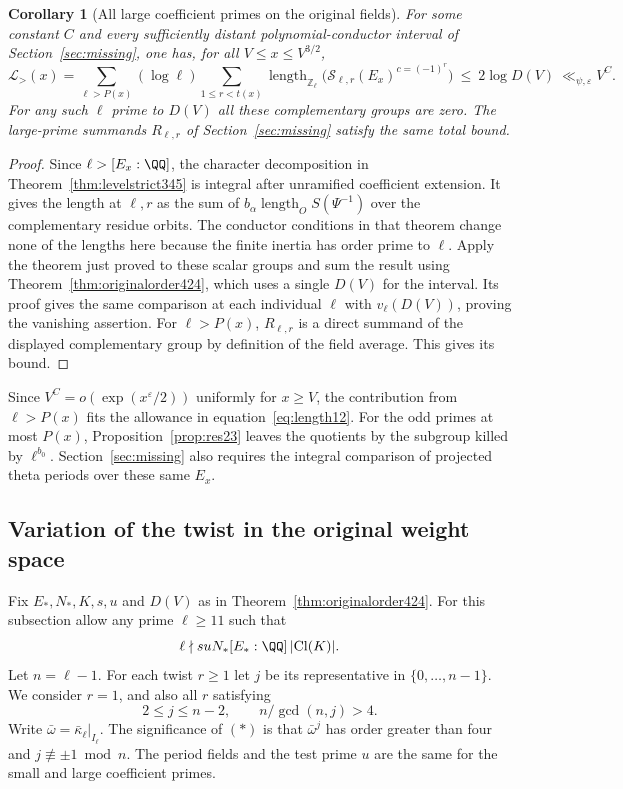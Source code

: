 \documentclass[a4paper,11pt]{article}
\newtheorem{corollary}[proposition]{Corollary}
\theoremstyle{definition}
\theoremstyle{remark}
\newcommand{\ZZ}{\mathbb Z}\newcommand{\ord}{\operatorname{ord}}
\numberwithin{equation}{section}
\begin{document}
\begin{corollary}[All large coefficient primes on the original fields]\leavevmode
\label{cor:periodlarge425}
For some constant \(C\) and every sufficiently distant
polynomial-conductor interval of Section~\ref{sec:missing},
one has, for all \(V\le x\le V^{3/2}\),
\[
 \mathcal L_{>}(x)=
 \sum_{\ell>P(x)}(\log\ell)\sum_{1\le r<t(x)}
      \operatorname{length}_{\ZZ_\ell}
      \bigl(\mathcal S_{\ell,r}(E_x)^{c=(-1)^r}\bigr)
   \ \le\ 2\log D(V)\ \ll_{\psi,\varepsilon} V^C .
\]
For any such \(\ell\) prime to \(D(V)\) all these complementary
groups are zero. The large-prime summands \(R_{\ell,r}\) of
Section~\ref{sec:missing} satisfy the same total bound.
\end{corollary}
\begin{proof}
Since \(\ell>[E_x:\QQ]\), the character decomposition in
Theorem~\ref{thm:levelstrict345} is integral after unramified
coefficient extension. It gives the length at \(\ell,r\) as
the sum of \(b_\alpha\operatorname{length}_O S(\Psi^{-1})\)
over the complementary residue orbits. The conductor conditions
in that theorem change none of the lengths here because the
finite inertia has order prime to \(\ell\). Apply the theorem
just proved to these scalar groups and sum the result using
Theorem~\ref{thm:originalorder424}, which uses a single \(D(V)\)
for the interval. Its proof gives the same comparison at each
individual \(\ell\) with \(v_\ell(D(V))\), proving the vanishing
assertion. For \(\ell>P(x)\), \(R_{\ell,r}\) is a direct summand
of the displayed complementary group by definition of the field
average. This gives its bound.
\end{proof}

Since \(V^C=o(\exp(x^\varepsilon/2))\) uniformly for \(x\ge V\),
the contribution from \(\ell>P(x)\) fits the allowance in
equation~\eqref{eq:length12}. For the odd primes at most \(P(x)\),
Proposition~\ref{prop:res23} leaves the quotients by the subgroup
killed by \(\ell^{b_0}\). Section~\ref{sec:missing} also requires
the integral comparison of projected theta periods over these
same \(E_x\).


\subsection{Variation of the twist in the original weight space}
\label{sec:regularresidual426}

Fix \(E_*,N_*,K,s,u\) and \(D(V)\) as in
Theorem~\ref{thm:originalorder424}. For this subsection allow
any prime \(\ell\ge11\) such that
\[
          \ell\nmid suN_*[E_*:\QQ]\,|\mathrm{Cl}(K)|.
\]
Let \(n=\ell-1\). For each twist \(r\ge1\) let \(j\) be its
representative in \(\{0,\dots,n-1\}\). We consider \(r=1\),
and also all \(r\) satisfying
\[
               2\le j\le n-2,\qquad n/\gcd(n,j)>4.        \tag{*}
\]
Write \(\bar\omega=\bar\kappa_\ell|_{I_\ell}\).
The significance of \((*)\) is that \(\bar\omega^j\) has
order greater than four and \(j\not\equiv\pm1\bmod n\).
The period fields and the test prime \(u\) are the same for
the small and large coefficient primes.
\end{document}
